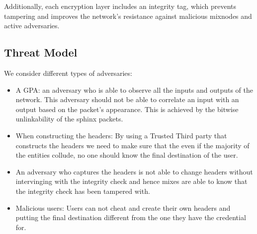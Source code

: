 Additionally, each encryption layer includes an integrity tag, which prevents tampering and improves the network’s resistance against malicious mixnodes and active adversaries.

\subsection{Threat Model}
We consider different types of adversaries:
\begin{itemize}
	\item A GPA: an adversary who is able to observe all the inputs and outputs of the network. This adversary should not be able to correlate an input with an output based on the packet's appearance. This is achieved by the bitwise unlinkability of the sphinx packets.
	\item When constructing the headers: By using a Trusted Third party that constructs the headers we need to make sure that the even if the majority of the entities collude, no one should know the final destination of the user.
	\item 	An adversary who captures the headers is not able to change headers without intervinging with the integrity check and hence mixes are able to know that the integrity check has been tampered with.
	\item Malicious users: Users can not cheat and create their own headers and putting the final destination different from the one they have the credential for.
\end{itemize}
